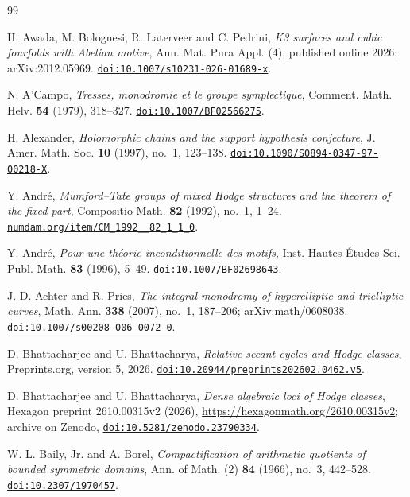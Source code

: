 \begin{thebibliography}{99}

H. Awada, M. Bolognesi, R. Laterveer and C. Pedrini,
\emph{K3 surfaces and cubic fourfolds with Abelian motive},
Ann. Mat. Pura Appl. (4), published online 2026; arXiv:2012.05969.
\href{https://doi.org/10.1007/s10231-026-01689-x}{\texttt{doi:10.1007/s10231-026-01689-x}}.

N. A'Campo,
\emph{Tresses, monodromie et le groupe symplectique},
Comment. Math. Helv. \textbf{54} (1979), 318--327.
\href{https://doi.org/10.1007/BF02566275}{\texttt{doi:10.1007/BF02566275}}.

H. Alexander,
\emph{Holomorphic chains and the support hypothesis conjecture},
J. Amer. Math. Soc. \textbf{10} (1997), no.~1, 123--138.
\href{https://doi.org/10.1090/S0894-0347-97-00218-X}{\texttt{doi:10.1090/S0894-0347-97-00218-X}}.

Y. Andr\'e,
\emph{Mumford--Tate groups of mixed Hodge structures and the theorem of the
fixed part},
Compositio Math. \textbf{82} (1992), no.~1, 1--24.
\href{http://www.numdam.org/item/CM_1992__82_1_1_0/}{\texttt{numdam.org/item/CM\_1992\_\_82\_1\_1\_0}}.

Y. Andr\'e,
\emph{Pour une th\'eorie inconditionnelle des motifs},
Inst. Hautes \'Etudes Sci. Publ. Math. \textbf{83} (1996), 5--49.
\href{https://doi.org/10.1007/BF02698643}{\texttt{doi:10.1007/BF02698643}}.

J. D. Achter and R. Pries,
\emph{The integral monodromy of hyperelliptic and trielliptic curves},
Math. Ann. \textbf{338} (2007), no.~1, 187--206; arXiv:math/0608038.
\href{https://doi.org/10.1007/s00208-006-0072-0}{\texttt{doi:10.1007/s00208-006-0072-0}}.

D. Bhattacharjee and U. Bhattacharya,
\emph{Relative secant cycles and Hodge classes},
Preprints.org, version 5, 2026.
\href{https://doi.org/10.20944/preprints202602.0462.v5}{\texttt{doi:10.20944/preprints202602.0462.v5}}.

D. Bhattacharjee and U. Bhattacharya,
\emph{Dense algebraic loci of Hodge classes},
Hexagon preprint 2610.00315v2 (2026), \url{https://hexagonmath.org/2610.00315v2};
archive on Zenodo, \href{https://doi.org/10.5281/zenodo.23790334}{\texttt{doi:10.5281/zenodo.23790334}}.

W. L. Baily, Jr. and A. Borel,
\emph{Compactification of arithmetic quotients of bounded symmetric domains},
Ann. of Math. (2) \textbf{84} (1966), no.~3, 442--528.
\href{https://doi.org/10.2307/1970457}{\texttt{doi:10.2307/1970457}}.


\end{thebibliography}
